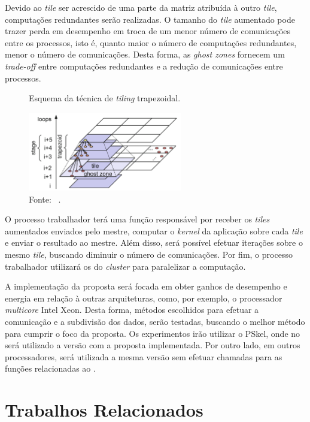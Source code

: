 Devido ao \textit{tile} ser acrescido de uma parte da matriz atribuída à outro
\textit{tile}, computações redundantes serão realizadas. O tamanho do
\textit{tile} aumentado pode trazer perda em desempenho em troca de um menor
número de comunicações entre os processos, isto é, quanto maior o número de
computações redundantes, menor o número de comunicações. Desta forma, as \textit{ghost zones}
fornecem um \textit{trade-off} entre computações redundantes e a redução de
comunicações entre processos.

\begin{figure}[h]
	\centering
    \caption{Esquema da técnica de \textit{tiling} trapezoidal.}
    \includegraphics[width=0.6\textwidth]{figs/tiling.pdf}
    \caption*{Fonte: ~\cite{meng11}.}
    \label{fig:tiling}
\end{figure}



O processo trabalhador terá uma função responsável por receber os
\textit{tiles} aumentados enviados pelo mestre, computar o \textit{kernel} da aplicação
sobre cada \textit{tile} e enviar o resultado ao mestre.
Além disso, será possível efetuar iterações sobre o mesmo \textit{tile},
buscando diminuir o número de comunicações. Por fim, o processo trabalhador utilizará os \pes do
\textit{cluster} para paralelizar a computação.

A implementação da proposta será focada em obter ganhos de desempenho e energia
em relação à outras arquiteturas, como, por exemplo, o processador
\textit{multicore} Intel Xeon. Desta forma, métodos escolhidos para efetuar a
comunicação e a subdivisão dos dados, serão testadas, buscando o melhor método
para cumprir o foco da proposta. Os experimentos irão utilizar o \fw PSkel, onde
no \mppa será utilizado a versão com a proposta implementada.  Por outro lado, em outros
processadores, será utilizada a mesma versão sem efetuar chamadas para as
funções relacionadas ao \mppa.

\section{Trabalhos Relacionados}

